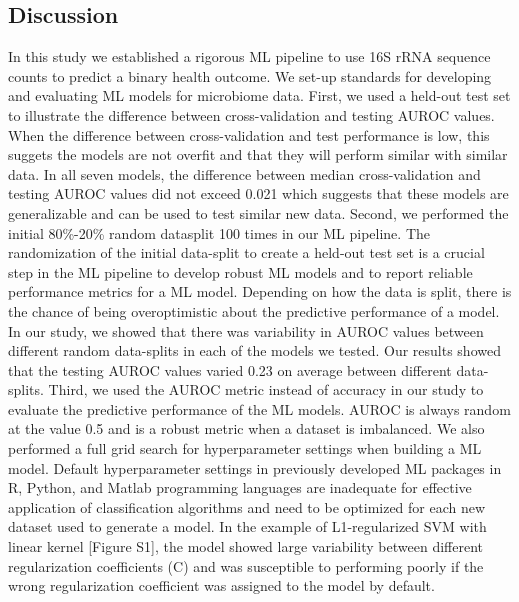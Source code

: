 \documentclass[11pt,]{article}
\begin{document}
\subsection{Discussion}\label{discussion}

In this study we established a rigorous ML pipeline to use 16S rRNA
sequence counts to predict a binary health outcome. We set-up standards
for developing and evaluating ML models for microbiome data. First, we
used a held-out test set to illustrate the difference between
cross-validation and testing AUROC values. When the difference between
cross-validation and test performance is low, this suggets the models
are not overfit and that they will perform similar with similar data. In
all seven models, the difference between median cross-validation and
testing AUROC values did not exceed 0.021 which suggests that these
models are generalizable and can be used to test similar new data.
Second, we performed the initial 80\%-20\% random datasplit 100 times in
our ML pipeline. The randomization of the initial data-split to create a
held-out test set is a crucial step in the ML pipeline to develop robust
ML models and to report reliable performance metrics for a ML model.
Depending on how the data is split, there is the chance of being
overoptimistic about the predictive performance of a model. In our
study, we showed that there was variability in AUROC values between
different random data-splits in each of the models we tested. Our
results showed that the testing AUROC values varied 0.23 on average
between different data-splits. Third, we used the AUROC metric instead
of accuracy in our study to evaluate the predictive performance of the
ML models. AUROC is always random at the value 0.5 and is a robust
metric when a dataset is imbalanced. We also performed a full grid
search for hyperparameter settings when building a ML model. Default
hyperparameter settings in previously developed ML packages in R,
Python, and Matlab programming languages are inadequate for effective
application of classification algorithms and need to be optimized for
each new dataset used to generate a model. In the example of
L1-regularized SVM with linear kernel {[}Figure S1{]}, the model showed
large variability between different regularization coefficients (C) and
was susceptible to performing poorly if the wrong regularization
coefficient was assigned to the model by default.
\end{document}
